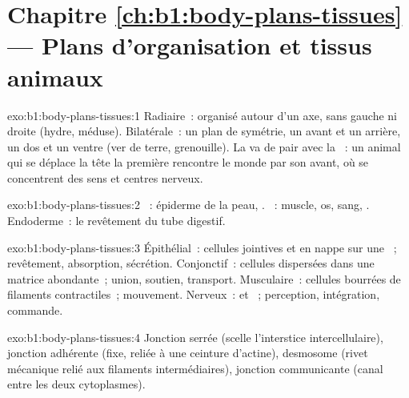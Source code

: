 \section*{Chapitre \ref{ch:b1:body-plans-tissues} --- Plans d'organisation et tissus animaux}

\begin{solution}{exo:b1:body-plans-tissues:1}
Radiaire~: organisé autour d'un axe, sans gauche ni droite (hydre,
méduse). Bilatérale~: un plan de symétrie, un avant et un arrière, un
dos et un ventre (ver de terre, grenouille). La  va de pair
avec la ~: un animal qui se déplace la tête la
première rencontre le monde par son avant, où se concentrent  des
sens et centres nerveux.
\end{solution}

\begin{solution}{exo:b1:body-plans-tissues:2}
~: épiderme de la peau, . ~: muscle, os,
sang, . Endoderme~: le revêtement du tube digestif.
\end{solution}

\begin{solution}{exo:b1:body-plans-tissues:3}
Épithélial~: cellules jointives et  en nappe sur une ~; revêtement, absorption, sécrétion. Conjonctif~: cellules
dispersées dans une matrice abondante~; union, soutien, transport.
Musculaire~: cellules bourrées de filaments contractiles~; mouvement.
Nerveux~:  et ~; perception, intégration,
commande.
\end{solution}

\begin{solution}{exo:b1:body-plans-tissues:4}
Jonction serrée (scelle l'interstice intercellulaire), jonction
adhérente (fixe, reliée à une ceinture d'actine), desmosome (rivet
mécanique relié aux filaments intermédiaires), jonction communicante
(canal entre les deux cytoplasmes).
\end{solution}

